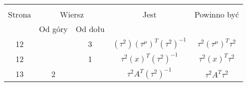 \documentclass[a4paper,11pt]{article}
\begin{document}


\begin{center}

  \begin{tabular}{|c|c|c|c|c|}
    \hline
    & \multicolumn{2}{c|}{} & & \\
    Strona & \multicolumn{2}{c|}{Wiersz} & Jest
                              & Powinno być \\ \cline{2-3}
    & Od góry & Od dołu & & \\
    \hline
    12 & &  3 & $( \tau^{ 2 } )( \tau^{ \mu } )^{ T }( \tau^{ 2 } )^{ -1 }$
           & $\tau^{ 2 } ( \tau^{ \mu } )^{ T } \tau^{ 2 }$ \\
    12 & & 1 & $\tau^{ 2 } ( x )^{ T }( \tau^{ 2 } )^{ -1 }$
           & $\tau^{ 2 } ( x )^{ T } \tau^{ 2 }$ \\ %
    13 & 2 & & $\tau^{ 2 } A^{ T }( \tau^{ 2 } )^{ -1 }$
           & $\tau^{ 2 } A^{ T } \tau^{ 2 }$ \\
    \hline
  \end{tabular}

\end{center}




\vspace{\spaceTwo}
















{}






\end{document}
